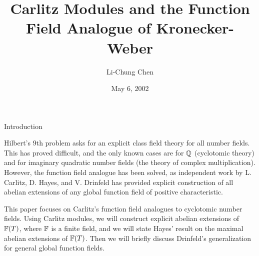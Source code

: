 \documentclass[12pt]{article}
\title{Carlitz Modules and the Function Field Analogue of Kronecker-Weber}
\author{Li-Chung Chen}
\date{May 6, 2002}
\begin{document}
\maketitle

\begin{section}{Introduction}

Hilbert's 9th problem asks for an explicit class field theory for all
number fields.  This has proved difficult, and the only known cases are
for ${\mathbb Q}$ (cyclotomic theory) and for imaginary quadratic number fields
(the theory of complex multiplication).  However, the function field
analogue has been solved, as independent work by L. Carlitz, D. Hayes, and
V. Drinfeld has provided explicit construction of all abelian extensions
of any global function field of positive characteristic.

This paper focuses on Carlitz's function field analogues to cyclotomic
number fields.  Using Carlitz modules, we will construct explicit abelian
extensions of ${\mathbb F}(T)$, where ${\mathbb F}$ is a finite field, and we will state
Hayes' result on the maximal abelian extensions of ${\mathbb F}(T)$.  Then we will
briefly discuss Drinfeld's generalization for general global function
fields.

\end{section} %
\end{document}
